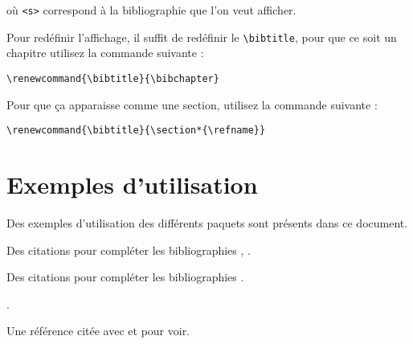 où \verb|<s>| correspond à la bibliographie que l'on veut afficher.

Pour redéfinir l'affichage, il suffit de redéfinir le \verb|\bibtitle|, pour que ce soit un chapitre utilisez la commande suivante :

\begin{framed}\vspace{-0.75em}
\begin{verbatim}\renewcommand{\bibtitle}{\bibchapter}
\end{verbatim}\vspace{-0.75em}
\end{framed}

Pour que ça apparaisse comme une section, utilisez la commande suivante :

\begin{framed}\vspace{-0.75em}
\begin{verbatim}\renewcommand{\bibtitle}{\section*{\refname}}
\end{verbatim}\vspace{-0.75em}
\end{framed}


\section{Exemples d'utilisation}

Des exemples d'utilisation des différents paquets sont présents dans ce document.


Des citations pour compléter les bibliographies , .


Des citations pour compléter les bibliographies .

.

Une référence citée avec   et  \cite{DHHS2011} pour voir.


\renewcommand{\bibtitle}{\section*{\refname}}
